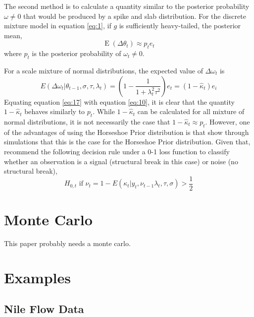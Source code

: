 \documentclass{article}
\DeclareMathOperator{\E}{E}
\begin{document}
The second method is to calculate a quantity similar to the posterior probability $\omega \neq 0$ that would be produced by a spike and slab distribution.
For the discrete mixture model in equation \eqref{eq:1}, if $g$ is sufficiently heavy-tailed, the posterior mean,
\begin{equation}
  \label{eq:17}
  \E(\Delta \theta_{t}) \approx p_{t} e_{t} 
\end{equation}
where $p_{t}$ is the posterior probability of $\omega_{t} \neq 0$.

For a scale mixture of normal distributions, the expected value of $\Delta \omega_{t}$ is 
\begin{equation}
  \label{eq:10}
  E(\Delta \omega_{t} | \theta_{t - 1}, \sigma, \tau, \lambda_{t}) =
  \left(
    1 - \frac{1}{1 + \lambda^{2}_{t} \tau^{2}}
  \right) e_{t} = (1 - \hat \kappa_{t}) e_{i}
\end{equation}
Equating equation \eqref{eq:17} with equation \eqref{eq:10}, it is clear that 
the quantity $1 - \hat \kappa_{t}$ behaves similarly to $p_{t}$.
While $1 - \hat \kappa_{t}$ can be calculated for all mixture of normal distributions, it is not necessarily the case that $1 - \hat \kappa_{t} \approx p_{t}$.
However, one of the advantages of using the Horseshoe Prior distribution is that 
\parencite[474]{CarvalhoPolsonScott2010} show through simulations that this is the case for the Horseshoe Prior distribution.
Given that, \textcite{CarvalhoPolsonScott2010} recommend the following  decision rule under a 0-1 loss function to classify whether an observation is a signal (structural break in this case) or noise (no structural break), 
\begin{equation}
  \label{eq:5}
  \text{$H_{0,t}$ if $\nu_{t} = 1 - E(\kappa_{t}|y_{t}, \nu_{t-1} \lambda_{t}, \tau, \sigma) > \frac{1}{2}$}
\end{equation}

\section{Monte Carlo}
\label{sec:monte-carlo}

This paper probably needs a monte carlo.

\section{Examples}
\label{sec:examples}

\subsection{Nile Flow Data}
\label{sec:nile}
\end{document}

